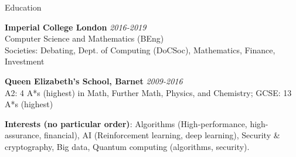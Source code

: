 \documentclass[10pt]{resume} %
\begin{document}

\begin{rSection}{Education}

{\bf Imperial College London} \hfill {\em 2016-2019} \\ 
Computer Science and Mathematics (BEng)\smallskip\\
Societies: Debating, Dept. of Computing (DoCSoc), Mathematics, Finance,
Investment

{\bf Queen Elizabeth's School, Barnet} \hfill {\em 2009-2016} \\ 
A2: 4 A*s (highest) in Math, Further Math, Physics, and Chemistry; GCSE: 13 A*s (highest)


\textbf{Interests (no particular order)}:
  Algorithms (High-performance, high-assurance, financial),
  AI (Reinforcement learning, deep learning),
  Security \& cryptography,
  Big data,
  Quantum computing (algorithms, security).

\end{rSection}

\end{document}
